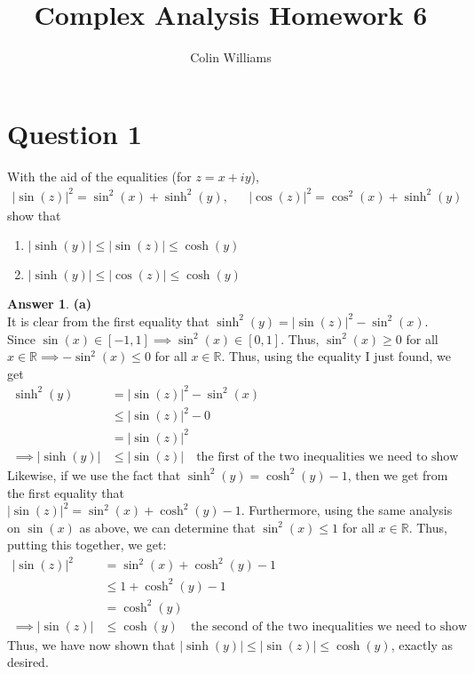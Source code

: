 \documentclass[10pt,a4paper]{article}
\title{Complex Analysis Homework 6}
\author{Colin Williams}
\theoremstyle{definition}
\newtheorem*{answer*}{Answer}
\begin{document}
\maketitle

\section*{Question 1}
With the aid of the equalities (for $z = x + iy$),
\begin{align*}
|\sin(z)|^2 = \sin^2(x) + \sinh^2(y), && |\cos(z)|^2 = \cos^2(x) + \sinh^2(y)
\end{align*}
show that
\begin{enumerate}[label = (\alph*)]
\item $|\sinh(y)| \leq |\sin(z)| \leq \cosh(y)$
\item $|\sinh(y)| \leq |\cos(z)| \leq \cosh(y)$
\end{enumerate}

\begin{answer*}{\textbf{(a)}}
\\It is clear from the first equality that $\sinh^2(y) = |\sin(z)|^2 - \sin^2(x)$. Since $\sin(x) \in [-1, 1] \implies \sin^2(x) \in [0,1]$. Thus, $\sin^2(x) \geq 0$ for all $x \in \mathbb{R} \implies -\sin^2(x) \leq 0$ for all $x \in \mathbb{R}$. Thus, using the equality I just found, we get
\begin{align*}
\sinh^2(y) &= |\sin(z)|^2 - \sin^2(x)\\
&\leq |\sin(z)|^2 - 0\\
&= |\sin(z)|^2\\
\implies |\sinh(y)| &\leq |\sin(z)| \quad \text{the first of the two inequalities we need to show}
\end{align*}
Likewise, if we use the fact that $\sinh^2(y) = \cosh^2(y) - 1$, then we get from the first equality that \\$|\sin(z)|^2 = \sin^2(x) + \cosh^2(y) - 1$. Furthermore, using the same analysis on $\sin(x)$ as above, we can determine that $\sin^2(x) \leq 1$ for all $x \in \mathbb{R}$. Thus, putting this together, we get:
\begin{align*}
|\sin(z)|^2 &= \sin^2(x) + \cosh^2(y) - 1\\
&\leq 1 + \cosh^2(y) - 1\\
&= \cosh^2(y)\\
\implies |\sin(z)| &\leq \cosh(y) \quad \text{the second of the two inequalities we need to show}
\end{align*}
Thus, we have now shown that $|\sinh(y)| \leq |\sin(z)| \leq \cosh(y)$, exactly as desired. 
\end{answer*}
\end{document}
